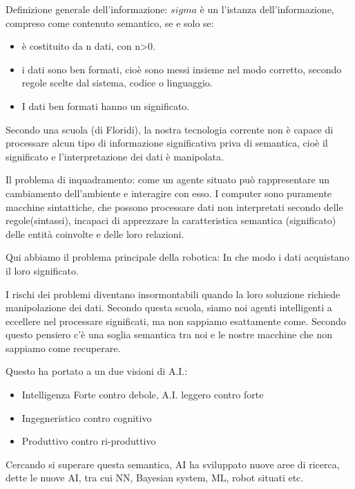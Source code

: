 \documentclass[a4page, 11pt]{article}
\begin{document}
Definizione generale dell'informazione: $sigma$ è un l'istanza
dell'informazione, compreso come contenuto semantico, se e solo se:

\begin{itemize}
	 
	\item
	è costituito da n dati, con n\textgreater{}0.
	\item
	i dati sono ben formati, cioè sono messi insieme nel modo corretto,
	secondo regole scelte dal sistema, codice o linguaggio.
	\item
	I dati ben formati hanno un significato.
\end{itemize}

Secondo una scuola (di Floridi), la nostra tecnologia corrente non è
capace di processare alcun tipo di informazione significativa priva di
semantica, cioè il significato e l'interpretazione dei dati è
manipolata.

Il problema di inquadramento: come un agente situato può rappresentare
un cambiamento dell'ambiente e interagire con esso. I computer sono
puramente macchine sintattiche, che possono processare dati non
interpretati secondo delle regole(sintassi), incapaci di apprezzare la
caratteristica semantica (significato) delle entità coinvolte e delle
loro relazioni.

Qui abbiamo il problema principale della robotica: In che modo i dati
acquistano il loro significato.

I rischi dei problemi diventano insormontabili quando la loro soluzione
richiede manipolazione dei dati. Secondo questa scuola, siamo noi agenti
intelligenti a eccellere nel processare significati, ma non sappiamo
esattamente come. Secondo questo pensiero c'è una soglia semantica tra
noi e le nostre macchine che non sappiamo come recuperare.

Questo ha portato a un due visioni di A.I.:

\begin{itemize}
	 
	\item
	Intelligenza Forte contro debole, A.I. leggero contro forte
	\item
	Ingegneristico contro cognitivo
	\item
	Produttivo contro ri-produttivo
\end{itemize}

Cercando si superare questa semantica, AI ha sviluppato nuove aree di
ricerca, dette le nuove AI, tra cui NN, Bayesian system, ML, robot
situati etc.
\end{document}
